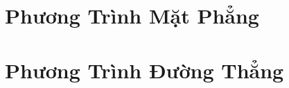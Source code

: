 \documentclass[oneside]{book}
\numberwithin{equation}{section}
\begin{document}

\section{Phương Trình Mặt Phẳng}


\section{Phương Trình Đường Thẳng}


\printbibliography[heading=bibintoc]
	
\end{document}
